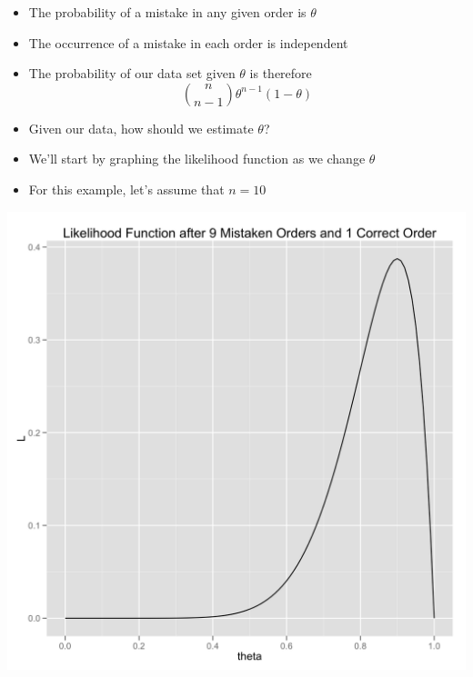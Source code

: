 \documentclass{beamer}
\begin{document}
\frame
{
  \begin{itemize}
    \item{The probability of a mistake in any given order is $\theta$}
    \item{The occurrence of a mistake in each order is independent}
    \item{The probability of our data set given $\theta$ is therefore}
  \[
  \binom{n}{n - 1} \theta ^ {n - 1} (1 - \theta)
  \]
  \end{itemize}
}

\frame
{
  \begin{itemize}
    \item{Given our data, how should we estimate $\theta$?}
    \item{We'll start by graphing the likelihood function as we change $\theta$}
    \item{For this example, let's assume that $n = 10$}
  \end{itemize}
}

\frame
{
  \begin{center}
    \includegraphics[scale = 0.1]{likelihood_function.png}
  \end{center}
}
\end{document}

